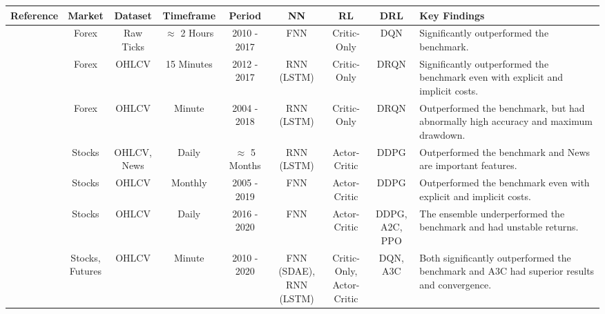 \begin{sidewaystable}
\centering
\footnotesize
\begin{tabularx}{\linewidth}{@{}ccccccccX@{}}
\toprule
\textbf{Reference} & \textbf{Market} & \textbf{Dataset} & \textbf{Timeframe} & \textbf{Period} & \textbf{NN} & \textbf{RL} & \textbf{DRL} & \textbf{Key Findings} \\
\midrule

\cite{carapuco_reinforcement_2018} & Forex & Raw Ticks & \(\approx\) 2 Hours & 2010 - 2017 & FNN & Critic-Only & DQN & Significantly outperformed the benchmark. \\

\cite{huang_financial_2018} & Forex & OHLCV & 15 Minutes & 2012 - 2017 & RNN (LSTM) & Critic-Only & DRQN & Significantly outperformed the benchmark even with explicit and implicit costs. \\

\cite{rundo_deep_2019} & Forex & OHLCV & Minute & 2004 - 2018 & RNN (LSTM) & Critic-Only & DRQN & Outperformed the benchmark, but had abnormally high accuracy and maximum drawdown. \\

\cite{saini_stock_2019} & Stocks & \makecell{OHLCV, \\ News} & Daily & \(\approx\) 5 Months & RNN (LSTM) & Actor-Critic & DDPG & Outperformed the benchmark and News are important features. \\

\cite{gran_deep_2019} & Stocks & OHLCV & Monthly & 2005 - 2019 & FNN & Actor-Critic & DDPG & Outperformed the benchmark even with explicit and implicit costs. \\

\cite{kong_empirical_2023} & Stocks & OHLCV & Daily & 2016 - 2020 & FNN & Actor-Critic & \makecell{DDPG, \\ A2C, PPO} & The ensemble underperformed the benchmark and had unstable returns. \\

\cite{li_deep_2019} & \makecell{Stocks, \\ Futures} & OHLCV & Minute & 2010 - 2020 & \makecell{FNN (SDAE), \\ RNN (LSTM)} & \makecell{Critic-Only, \\ Actor-Critic} & DQN, A3C & Both significantly outperformed the benchmark and A3C had superior results and convergence. \\


\end{tabularx}
\end{sidewaystable}
